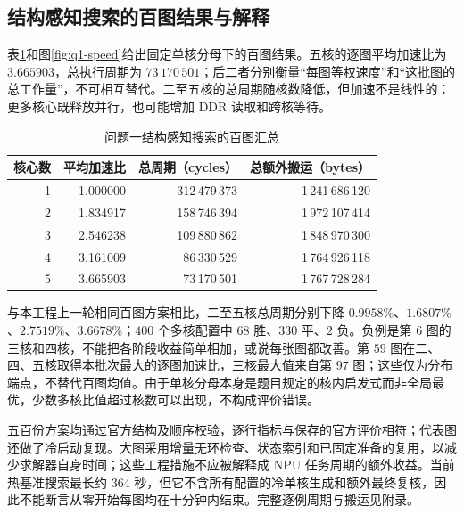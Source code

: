 \subsection{结构感知搜索的百图结果与解释}
表\ref{tab:q1-main}和图\ref{fig:q1-speed}给出固定单核分母下的百图结果。五核的逐图平均加速比为 $3.665903$，总执行周期为 $73\,170\,501$；后二者分别衡量“每图等权速度”和“这批图的总工作量”，不可相互替代。二至五核的总周期随核数降低，但加速不是线性的：更多核心既释放并行，也可能增加 DDR 读取和跨核等待。
\begin{table}[!htbp]\centering
\caption{问题一结构感知搜索的百图汇总}\label{tab:q1-main}
\begin{tabular}{rrrr}
\toprule
核心数 & 平均加速比 & 总周期（cycles） & 总额外搬运（bytes）\\
\midrule
1 & 1.000000 & 312\,479\,373 & 1\,241\,686\,120\\
2 & 1.834917 & 158\,746\,394 & 1\,972\,107\,414\\
3 & 2.546238 & 109\,880\,862 & 1\,848\,970\,300\\
4 & 3.161009 & 86\,330\,529 & 1\,764\,926\,118\\
5 & 3.665903 & 73\,170\,501 & 1\,767\,728\,284\\
\bottomrule
\end{tabular}
\end{table}


与本工程上一轮相同百图方案相比，二至五核总周期分别下降 $0.9958\%$、$1.6807\%$、$2.7519\%$、$3.6678\%$；$400$ 个多核配置中 $68$ 胜、$330$ 平、$2$ 负。负例是第 $6$ 图的三核和四核，不能把各阶段收益简单相加，或说每张图都改善。第 $59$ 图在二、四、五核取得本批次最大的逐图加速比，三核最大值来自第 $97$ 图；这些仅为分布端点，不替代百图均值。由于单核分母本身是题目规定的核内启发式而非全局最优，少数多核比值超过核数可以出现，不构成评价错误。

五百份方案均通过官方结构及顺序校验，逐行指标与保存的官方评价相符；代表图还做了冷启动复现。大图采用增量无环检查、状态索引和已固定准备的复用，以减少求解器自身时间；这些工程措施不应被解释成 NPU 任务周期的额外收益。当前热基准搜索最长约 $364$ 秒，但它不含所有配置的冷单核生成和额外最终复核，因此不能断言从零开始每图均在十分钟内结束。完整逐例周期与搬运见附录。



